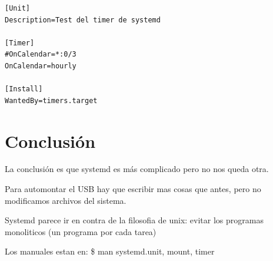 \documentclass[10pt,a4paper]{article}
\begin{document}
\begin{scriptsize}
\begin{mdframed}
\begin{verbatim}
[Unit]
Description=Test del timer de systemd

[Timer]
#OnCalendar=*:0/3
OnCalendar=hourly

[Install]
WantedBy=timers.target
\end{verbatim}
\end{mdframed}
\end{scriptsize}

\section{Conclusi\'on}

La conclusi\'on es que systemd es m\'as complicado pero no nos queda otra.

Para automontar el USB hay que escribir mas cosas que antes, pero no modificamos archivos del sistema.

Systemd parece ir en contra de la filosofia de unix: evitar los programas monoliticos (un programa por cada tarea)

Los manuales estan en: \$ man systemd.{unit, mount, timer}
\end{document}
